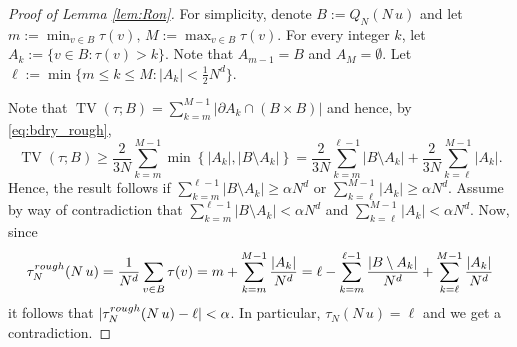 \documentclass[11pt, reqno]{amsart}
\DeclareMathOperator{\TV}{TV}
\numberwithin{equation}{section}
\begin{document}
\begin{proof}[Proof of Lemma \ref{lem:Ron}]
For simplicity, denote $B:=Q_N(N\,u)$ and let $m:=\min_{v\in B}\tau(v),\, M:=\max_{v\in B}\tau(v)$. 
For every integer $k$, let
$A_k:=\{v\in B\colon  \tau(v)> k\}$.
Note that $A_{m-1}=B$ and $A_M=\emptyset$. Let $\ell:=\min\{m\leq k\leq M\colon  |A_k|<\frac{1}{2}N^d\}$. 

Note that $\TV\left(\tau; B\right)=\sum_{k=m}^{M-1}\lvert \partial A_k\cap(B\times B)\rvert$ and hence, by \eqref{eq:bdry_rough},
\begin{equation*}
\TV\left(\tau; B\right)\geq\frac{ 2}{3N}\sum_{k=m}^{M-1}\min\left\{\lvert A_k\rvert,\lvert B\setminus A_k\rvert\right\}=\frac{ 2}{3N}\sum_{k=m}^{\ell-1}\lvert B\setminus A_k\rvert+\frac{2}{3N}\sum_{k=\ell}^{M-1}\lvert A_k\rvert.
\end{equation*}
Hence, the result follows if $\sum_{k=m}^{\ell-1}\lvert B\setminus A_k\rvert\geq \alpha N^d$ or $\sum_{k=\ell}^{M-1}\lvert A_k\rvert\geq \alpha N^d$.
Assume by way of contradiction that
$\sum_{k=m}^{\ell-1}\lvert B\setminus A_k\rvert<\alpha N^d$ and 
$\sum_{k=\ell}^{M-1}\lvert A_k\rvert<\alpha N^d$. 
Now, since
\begin{equation*}
\tau^{\rm rough}_N(N\,u)=\frac{1}{N^d}\sum_{v\in B}\tau(v)
=m+\sum_{k=m}^{M-1}\frac{\lvert A_k\rvert}{N^d}
=\ell-\sum_{k=m}^{\ell-1}\frac{\lvert B\setminus A_k\rvert}{N^d}+\sum_{k=\ell}^{M-1}\frac{\lvert A_k\rvert}{N^d}
\end{equation*}
it follows that $\lvert\tau^{\rm rough}_N(N\,u)-\ell\rvert<\alpha$. In particular, $\tau_N(N\, u)=\ell$ and we get a contradiction.
\end{proof}
\end{document}
